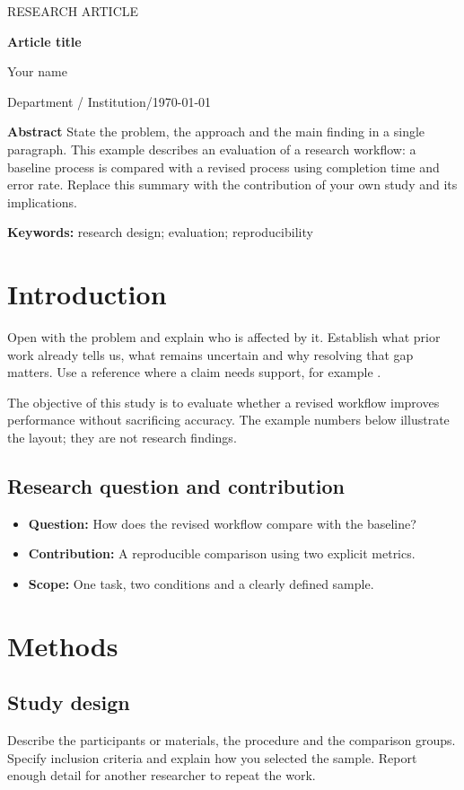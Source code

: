 \documentclass[11pt,a4paper]{article}
\newcommand{\articletitle}{Article title}
\newcommand{\authorname}{Your name}
\newcommand{\affiliation}{Department / Institution}
\begin{document}
\thispagestyle{plain}
{\small\sffamily\color{accent}RESEARCH ARTICLE}\par
\vspace{8pt}
{\LARGE\bfseries\articletitle\par}
\vspace{7pt}
{\large\authorname}\par
{\small\color{muted}\affiliation\quad /\quad \today}\par
{}\vspace{10pt}
\textbf{Abstract}\quad
State the problem, the approach and the main finding in a single paragraph.
This example describes an evaluation of a research workflow: a baseline process
is compared with a revised process using completion time and error rate.
Replace this summary with the contribution of your own study and its implications.

{\small\textbf{Keywords:} research design; evaluation; reproducibility}
\section{Introduction}
Open with the problem and explain who is affected by it. Establish what prior
work already tells us, what remains uncertain and why resolving that gap matters.
Use a reference where a claim needs support, for example \cite{example}.

The objective of this study is to evaluate whether a revised workflow improves
performance without sacrificing accuracy. The example numbers below illustrate
the layout; they are not research findings.
\subsection{Research question and contribution}
\begin{itemize}
\item \textbf{Question:} How does the revised workflow compare with the baseline?
\item \textbf{Contribution:} A reproducible comparison using two explicit metrics.
\item \textbf{Scope:} One task, two conditions and a clearly defined sample.
\end{itemize}
\section{Methods}
\subsection{Study design}
Describe the participants or materials, the procedure and the comparison groups.
Specify inclusion criteria and explain how you selected the sample. Report enough
detail for another researcher to repeat the work.
\end{document}
